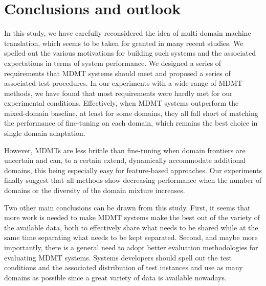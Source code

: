 \section{Conclusions and outlook \label{sec:conclusion-chap4}}

In this study, we have carefully reconsidered the idea of multi-domain machine translation, which seems to be taken for granted in many recent studies. We spelled out the various motivations for building such systems and the associated expectations in terms of system performance. We designed a series of requirements that MDMT systems should meet and proposed a series of associated test procedures. In our experiments with a wide range of MDMT methods, we have found that most requirements were hardly met for our experimental conditions. Effectively, when MDMT systems outperform the mixed-domain baseline, at least for some domains, they all fall short of matching the performance of fine-tuning on each domain, which remains the best choice in single domain adaptation.

However, MDMTs are less brittle than fine-tuning when domain frontiers are uncertain and can, to a certain extend, dynamically accommodate additional domains, this being especially easy for feature-based approaches. Our experiments finally suggest that all methods show decreasing performance when the number of domains or the diversity of the domain mixture increases.

Two other main conclusions can be drawn from this study. First, it seems that more work is needed to make MDMT systems make the best out of the variety of the available data, both to effectively share what needs to be shared while at the same time separating what needs to be kept separated. Second, and maybe more importantly, there is a general need to adopt better evaluation methodologies for evaluating MDMT systems. Systems developers should spell out the test conditions and the associated distribution of test instances and use as many domains as possible since a great variety of data is available nowadays.



